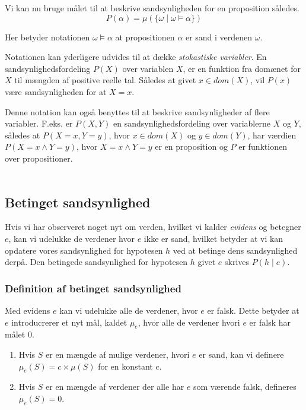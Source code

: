 Vi kan nu bruge målet til at beskrive sandsynligheden for en proposition således.
\begin{equation}
P(\alpha) = \mu(\{\omega \mid \omega \models \alpha \})
\end{equation}

Her betyder notationen $\omega \models \alpha$ at propositionen $\alpha$ er sand i verdenen $\omega$.


Notationen kan yderligere udvides til at dække \emph{stokastiske variabler}.
En sandsynlighedsfordeling $P(X)$ over variablen $ X $, er en funktion fra
domænet for $ X $ til mængden af positive reelle tal.
Således at givet $x \in dom(X)$, vil $P(x)$ være sandsynligheden for at $X = x$.

Denne notation kan også benyttes til at beskrive sandsynligheder af flere variabler.
F.eks. er $P(X,Y)$ en sandsynlighedsfordeling over variablerne $ X $ og $ Y $, 
således at $P(X = x, Y = y)$, hvor $x \in dom(X)$ og $y \in dom(Y)$, 
har værdien $P(X = x \wedge Y = y)$, hvor
$X = x \wedge Y = y$ er en proposition og $ P $ er funktionen over propositioner. \\ \\
\cite[s. 221-222]{ArtificialIntelligence}

\subsection{Betinget sandsynlighed}

Hvis vi har observeret noget nyt om verden, hvilket vi kalder \emph{evidens} og betegner $ e $, kan vi udelukke de verdener
hvor $ e $ ikke er sand, hvilket betyder at vi kan opdatere vores sandsynlighed for hypotesen $ h $ ved at betinge dens sandsynlighed derpå.
Den betingede sandsynlighed for hypotesen $ h $ givet $ e $ skrives $P(h \mid e)$.


\subsubsection{Definition af betinget sandsynlighed}
Med evidens $e$ kan vi udelukke alle de verdener, hvor $e$ er falsk.
Dette betyder at $e$ introducrerer et nyt mål, kaldet $\mu_e$, hvor
alle de verdener hvori $e$ er falsk har målet $0$.
\begin{enumerate}
    \item Hvis $S$ er en mængde af mulige verdener, hvori $e$ er sand, 
kan vi definere $\mu_e(S) = c \times \mu(S)$ for en konstant c. 
    \item Hvis $S$ er en mængde af verdener der alle har $e$ som værende falsk, defineres $\mu_e(S) = 0$.
\end{enumerate}

